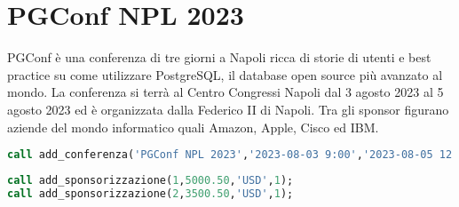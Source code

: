 \section{PGConf NPL 2023}
PGConf è una conferenza di tre giorni a Napoli ricca di storie di utenti e best practice su come utilizzare PostgreSQL, il database open source più avanzato al mondo. La conferenza si terrà al Centro Congressi Napoli dal 3 agosto 2023 al 5 agosto 2023 ed è organizzata dalla Federico II di Napoli. Tra gli sponsor figurano aziende del mondo informatico quali Amazon, Apple, Cisco ed IBM. 
\begin{lstlisting}[language=SQL, style=mystyle,caption={Aggiunta della conferenza}]
call add_conferenza('PGConf NPL 2023','2023-08-03 9:00','2023-08-05 12:30',5,'PGConf è una conferenza di tre giorni a Napoli ricca di storie di utenti e best practice su come utilizzare PostgreSQL, il database open source più avanzato al mondo','UNINA',1);
\end{lstlisting}
\begin{lstlisting}[language=SQL,style=mystyle,caption={Aggiunta delle sponsorizzazioni}]
call add_sponsorizzazione(1,5000.50,'USD',1);
call add_sponsorizzazione(2,3500.50,'USD',1);
\end{lstlisting}